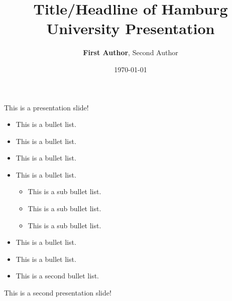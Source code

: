 \documentclass[aspectratio=169,17pt]{tuhh_presentation}
\title{Title/Headline of Hamburg University Presentation}
\date{\today}
\author{\textbf{First Author}, Second Author}
\institute{Institute of/Department}
\begin{document}
\titlepage

\begin{frame}{This is a presentation slide!}
    \begin{minipage}{0.49\textwidth}
        \begin{itemize}
            \item This is a bullet list.
            \item This is a bullet list.
            \item This is a bullet list.
            \item This is a bullet list.

            \begin{itemize}
                \item This is a sub bullet list.
                \item This is a sub bullet list.
                \item This is a sub bullet list.
            \end{itemize}
            \item This is a bullet list.
            \item This is a bullet list.
        \end{itemize}
    \end{minipage}
    \begin{minipage}{0.49\textwidth}
        \begin{itemize}
            \item This is a second bullet list.
        \end{itemize}
    \end{minipage}
\end{frame}

\begin{frame}{This is a second presentation slide!}




\end{frame}

\finalpage
\end{document}
